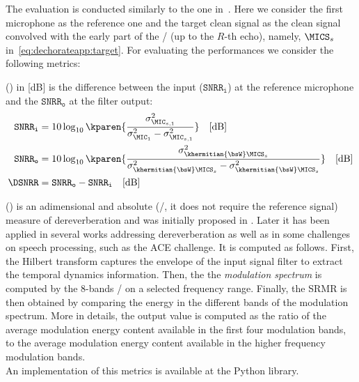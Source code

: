 \mynewline
The evaluation is conducted similarly to the one in~.
Here we consider the first microphone as the reference one and the target clean signal as the clean signal convolved with the early part of the \RIR/ (up to the $R$-th echo),
namely, $\MICS_s$ in~\cref{eq:dechorateapp:target}.
For evaluating the performances we consider the following metrics:

 (\DSNRR) in [dB] is the difference between the input ($\mathtt{SNRR}_\mathtt{i}$) at the reference microphone and the $\mathtt{SNRR}_\mathtt{o}$ at the filter output:
\newcommand{\hbsW}{\khermitian{\bsW}}
    \begin{equation}
        \begin{aligned}
            \mathtt{SNRR}_\mathtt{i} &= 10 \log_{10} \kparen{\frac{\sigma^2_{\MIC_{s, 1}}}{\sigma^2_{\MIC_{1}} -  \sigma^2_{\MIC_{s, 1}}}} \quad\text{[dB]}\\
            \mathtt{SNRR}_\mathtt{o} &= 10 \log_{10} \kparen{\frac{\sigma^2_{\hbsW \MICS_{s}}}{\sigma^2_{\hbsW \MICS_{s}} -  \sigma^2_{\hbsW \MICS_{s}}}} \quad\text{[dB]}\\
            \DSNRR &= \mathtt{SNRR}_\mathtt{o} - \mathtt{SNRR}_\mathtt{i} \quad\text{[dB]}
        \end{aligned}
    \end{equation}

 (\DSRMR) is an adimensional and absolute (\ie/, it does not require the reference signal) measure of dereverberation and was initially proposed in .
Later it has been applied in several works addressing dereverberation as well as in some challenges on speech processing, such as the ACE challenge.
It is computed as follows. First, the Hilbert transform captures the envelope of the input signal filter to extract the temporal dynamics information.
Then, the the \textit{modulation spectrum} is computed by the 8-bands \STFT/ on a selected frequency range.
Finally, the \ac{SRMR} is then obtained by comparing the energy in the different bands of the modulation spectrum.
More in details, the output value is computed as the ratio of the average modulation energy content available in the first four modulation bands,
to the average modulation energy content available in the higher frequency modulation bands.
\\An implementation of this metrics is available at the \href{https://github.com/aliutkus/speechmetrics/}{} Python library.

